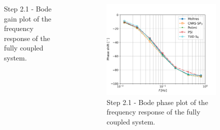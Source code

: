 \begin{frame}
\begin{columns}
\begin{figure}
      \caption{Step 2.1 - Bode gain plot of the frequency response of the fully
      coupled system.}
    \end{figure}
    \column[t]{4cm}
    \begin{figure}
      \centering
      \includegraphics[width=\columnwidth]{../images/2-1-phase-plot}
      \caption{Step 2.1 - Bode phase plot of the frequency response of the fully
      coupled system.}
    \end{figure}
    \hfill
  \end{columns}
\end{frame}
